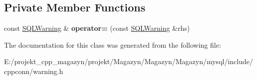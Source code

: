 \subsection*{Private Member Functions}
\begin{DoxyCompactItemize}
\item 
\hypertarget{classsql_1_1_s_q_l_warning_a383987b2b1d620afd5e61cc80c34ee63}{}\label{classsql_1_1_s_q_l_warning_a383987b2b1d620afd5e61cc80c34ee63} 
const \hyperlink{classsql_1_1_s_q_l_warning}{S\+Q\+L\+Warning} \& {\bfseries operator=} (const \hyperlink{classsql_1_1_s_q_l_warning}{S\+Q\+L\+Warning} \&rhs)
\end{DoxyCompactItemize}


The documentation for this class was generated from the following file\+:\begin{DoxyCompactItemize}
\item 
E\+:/projekt\+\_\+cpp\+\_\+magazyn/projekt/\+Magazyn/\+Magazyn/\+Magazyn/mysql/include/cppconn/warning.\+h\end{DoxyCompactItemize}
